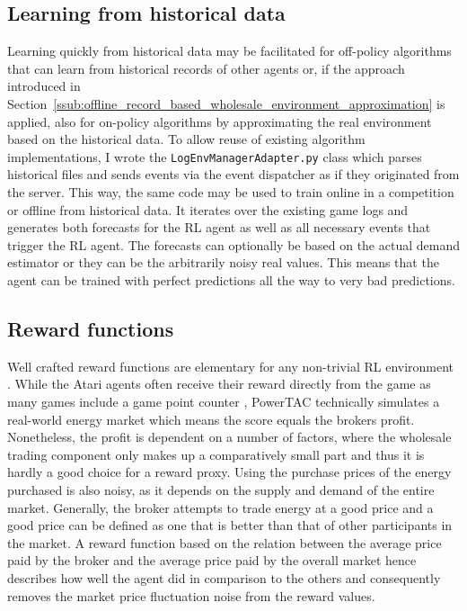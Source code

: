 \subsection{Learning from historical data}%
\label{sub:learning_from_historical_data}

Learning quickly from historical data may be facilitated for off-policy algorithms that can learn from historical
records of other agents or, if the approach introduced in
Section~\ref{ssub:offline_record_based_wholesale_environment_approximation} is applied, also for on-policy algorithms by
approximating the real environment based on the historical data.
To allow reuse of existing algorithm implementations, I wrote the \texttt{LogEnvManagerAdapter.py} class which
parses historical files and sends events via the event dispatcher as if they originated from the server. This way, the
same code may be used to train online in a competition or offline from historical data. It iterates over the existing
game logs and generates both forecasts for the \ac{RL} agent as well as all necessary events that trigger the \ac{RL}
agent. The forecasts can optionally be based on the actual demand estimator or they can be the arbitrarily noisy real
values. This means that the agent can be trained with perfect predictions all the way to very bad predictions.

\subsection{Reward functions}%
\label{sub:reward_functions}

Well crafted reward functions are elementary for any non-trivial \ac{RL}
environment \cite[p.469ff.]{amodei2016concrete, sutton2018reinforcement}. While the Atari agents often receive their reward directly from the
game as many games include a game point counter \cite[]{mnih2013playing}, \ac{PowerTAC} technically simulates a
real-world energy market which means the score equals the brokers profit. Nonetheless, the profit is dependent on a number of
factors, where the wholesale trading component only makes up a comparatively small part and thus it is hardly a
good choice for a reward proxy. Using the purchase prices of the energy purchased is also noisy, as it depends on the
supply and demand of the entire market. Generally, the broker attempts to trade energy at a good price and a good
price can be defined as one that is better than that of other participants in the market. A reward function based on the
relation between the average price paid by the broker and the average price paid by the overall market hence describes
how well the agent did in comparison to the others and consequently removes the market price fluctuation noise from the
reward values.


